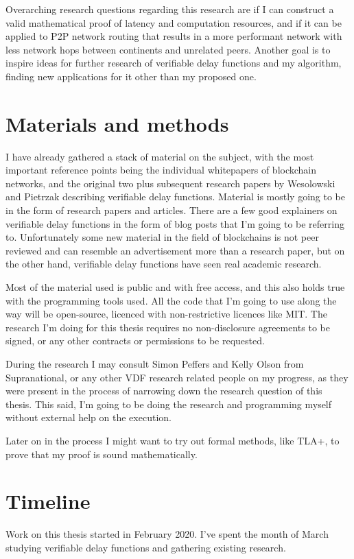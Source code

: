\documentclass[a4paper,12pt]{article}
\begin{document}
Overarching research questions regarding this research are if I can construct a valid mathematical proof of latency and computation resources, and if it can be applied to P2P network routing that results in a more performant network with less network hops between continents and unrelated peers. Another goal is to inspire ideas for further research of verifiable delay functions and my algorithm, finding new applications for it other than my proposed one.

\section{Materials and methods}
I have already gathered a stack of material on the subject, with the most important reference points being the individual whitepapers of blockchain networks, and the original two plus subsequent research papers by Wesolowski and Pietrzak describing verifiable delay functions. Material is mostly going to be in the form of research papers and articles. There are a few good explainers on verifiable delay functions in the form of blog posts that I'm going to be referring to. Unfortunately some new material in the field of blockchains is not peer reviewed and can resemble an advertisement more than a research paper, but on the other hand, verifiable delay functions have seen real academic research.

Most of the material used is public and with free access, and this also holds true with the programming tools used. All the code that I'm going to use along the way will be open-source, licenced with non-restrictive licences like MIT. The research I'm doing for this thesis requires no non-disclosure agreements to be signed, or any other contracts or permissions to be requested.

During the research I may consult Simon Peffers and Kelly Olson from Supranational, or any other VDF research related people on my progress, as they were present in the process of narrowing down the research question of this thesis. This said, I'm going to be doing the research and programming myself without external help on the execution.

Later on in the process I might want to try out formal methods, like TLA+, to prove that my proof is sound mathematically.

\section{Timeline}
Work on this thesis started in February 2020. I've spent the month of March studying verifiable delay functions and gathering existing research.
\end{document}
